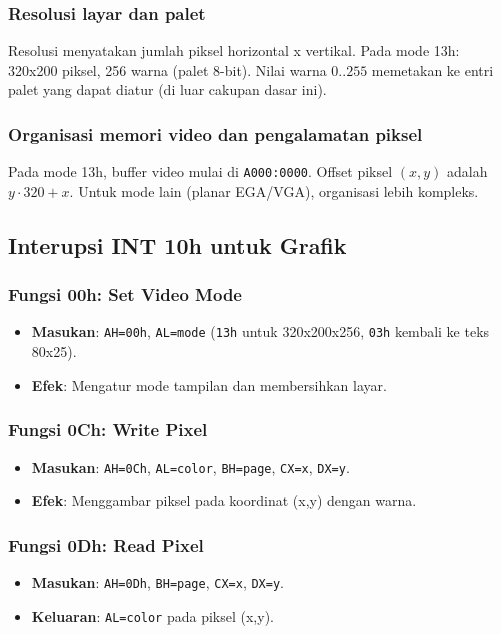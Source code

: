 \subsubsection{Resolusi layar dan palet}
Resolusi menyatakan jumlah piksel horizontal x vertikal. Pada mode 13h: 320x200 piksel, 256 warna (palet 8-bit). Nilai warna \(0..255\) memetakan ke entri palet yang dapat diatur (di luar cakupan dasar ini).

\subsubsection{Organisasi memori video dan pengalamatan piksel}
Pada mode 13h, buffer video mulai di \texttt{A000:0000}. Offset piksel \((x,y)\) adalah \(y\cdot 320 + x\). Untuk mode lain (planar EGA/VGA), organisasi lebih kompleks.

\subsection{Interupsi INT 10h untuk Grafik}
\subsubsection{Fungsi 00h: Set Video Mode}
\begin{itemize}
  \item \textbf{Masukan}: \texttt{AH=00h}, \texttt{AL=mode} (\texttt{13h} untuk 320x200x256, \texttt{03h} kembali ke teks 80x25).
  \item \textbf{Efek}: Mengatur mode tampilan dan membersihkan layar.
\end{itemize}

\subsubsection{Fungsi 0Ch: Write Pixel}
\begin{itemize}
  \item \textbf{Masukan}: \texttt{AH=0Ch}, \texttt{AL=color}, \texttt{BH=page}, \texttt{CX=x}, \texttt{DX=y}.
  \item \textbf{Efek}: Menggambar piksel pada koordinat (x,y) dengan warna.
\end{itemize}

\subsubsection{Fungsi 0Dh: Read Pixel}
\begin{itemize}
  \item \textbf{Masukan}: \texttt{AH=0Dh}, \texttt{BH=page}, \texttt{CX=x}, \texttt{DX=y}.
  \item \textbf{Keluaran}: \texttt{AL=color} pada piksel (x,y).
\end{itemize}

